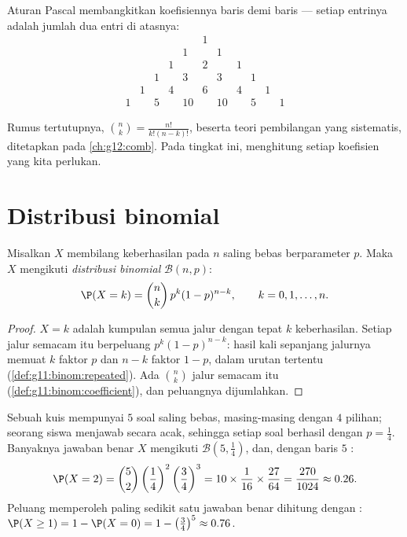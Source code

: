 Aturan Pascal membangkitkan koefisiennya baris demi baris --- setiap entrinya
adalah jumlah dua entri di atasnya:
\[
\begin{array}{ccccccccccc}
&&&&&1&&&&&\\
&&&&1&&1&&&&\\
&&&1&&2&&1&&&\\
&&1&&3&&3&&1&&\\
&1&&4&&6&&4&&1&\\
1&&5&&10&&10&&5&&1
\end{array}
\]

\begin{remark}
Rumus tertutupnya, $\binom nk = \frac{n!}{k!(n-k)!}$, beserta teori
pembilangan yang sistematis, ditetapkan pada \cref{ch:g12:comb}. Pada
tingkat ini,  menghitung setiap koefisien yang kita perlukan.
\end{remark}

\section{Distribusi binomial}

\begin{theorem}\label{thm:g11:binom:binomial}
Misalkan $X$ membilang keberhasilan pada $n$  saling bebas
berparameter $p$. Maka $X$ mengikuti \emph{distribusi
binomial} $\mathcal B(n, p)$:
\[
\P(X = k) = \binom{n}{k}\, p^k (1-p)^{n-k},
\qquad k = 0, 1, \dots, n .
\]
\end{theorem}

\begin{proof}
 $X = k$ adalah kumpulan semua jalur dengan tepat $k$
keberhasilan. Setiap jalur semacam itu berpeluang $p^k(1-p)^{n-k}$: hasil kali
sepanjang jalurnya memuat $k$ faktor $p$ dan $n - k$ faktor $1-p$, dalam
urutan tertentu (\cref{def:g11:binom:repeated}). Ada $\binom nk$ jalur semacam
itu (\cref{def:g11:binom:coefficient}), dan peluangnya dijumlahkan.
\end{proof}

\begin{example}\label{ex:g11:binom:quiz}
Sebuah kuis mempunyai $5$ soal saling bebas, masing-masing dengan $4$ pilihan;
seorang siswa menjawab secara acak, sehingga setiap soal berhasil dengan
$p = \frac14$. Banyaknya jawaban benar $X$ mengikuti
$\mathcal B\left(5, \frac14\right)$, dan, dengan baris $5$ :
\[
\P(X = 2) = \binom52 \left(\frac14\right)^2\left(\frac34\right)^3
= 10 \times \frac{1}{16} \times \frac{27}{64}
= \frac{270}{1024} \approx 0.26 .
\]
Peluang memperoleh paling sedikit satu jawaban benar dihitung dengan :
$\P(X \geq 1) = 1 - \P(X = 0) = 1 - \left(\frac34\right)^5 \approx
0.76$.
\end{example}

